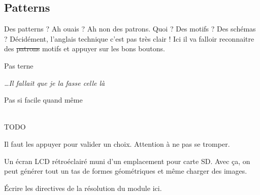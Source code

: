 \subsection{Patterns}
Des patterns ? Ah ouais ? Ah non des patrons. Quoi ? Des motifs ? Des schémas ?
Décidément, l'anglais technique c'est pas très clair ! Ici il va falloir
reconnaitre des \sout{patrons} motifs et appuyer sur les bons boutons.
\vspace{.5cm}
\begin{modulebox}{Pas terne}
  \begin{hangingpar}
    \begin{flushright}
    \textit{\dots Il fallait que je la fasse celle là}
    \end{flushright}
  \end{hangingpar}
  \begin{moduleaction}[Difficulté]
    Pas si facile quand même
  \end{moduleaction}
  \begin{moduleaction}
    \\\hline
    TODO
  \end{moduleaction}
  \hline%
  \begin{moduleaction}[boutons]
    Il faut les appuyer pour valider un choix. Attention à ne pas se tromper.
  \end{moduleaction}
  \begin{moduleaction}
    Un écran LCD rétroéclairé muni d'un emplacement pour carte SD. Avec ça, on
    peut générer tout un tas de formes géométriques et même charger des images.
  \end{moduleaction}
\end{modulebox}
\vspace{.5cm}

Écrire les directives de la résolution du module ici.
\newpage

